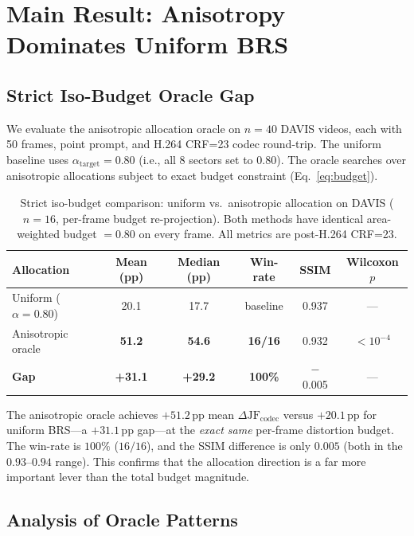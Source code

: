 \section{Main Result: Anisotropy Dominates Uniform BRS}
\label{sec:main_result}

\subsection{Strict Iso-Budget Oracle Gap}

We evaluate the anisotropic allocation oracle on $n{=}40$ DAVIS videos, each with 50 frames, point prompt, and H.264 CRF=23 codec round-trip.
The uniform baseline uses $\alpha_\mathrm{target}{=}0.80$ (i.e., all 8 sectors set to $0.80$).
The oracle searches over anisotropic allocations subject to exact budget constraint (Eq.~\ref{eq:budget}).

\begin{table}[t]
\centering
\small
\caption{Strict iso-budget comparison: uniform vs.\ anisotropic allocation on DAVIS ($n{=}16$, per-frame budget re-projection). Both methods have identical area-weighted budget $=0.80$ on every frame. All metrics are post-H.264 CRF=23.}
\label{tab:oracle_gap}
\begin{tabular}{lccccc}
\toprule
\textbf{Allocation} & \textbf{Mean (pp)} & \textbf{Median (pp)} & \textbf{Win-rate} & \textbf{SSIM} & \textbf{Wilcoxon $p$} \\
\midrule
Uniform ($\alpha{=}0.80$) & 20.1 & 17.7 & baseline & 0.937 & --- \\
Anisotropic oracle & \textbf{51.2} & \textbf{54.6} & \textbf{16/16} & 0.932 & $< 10^{-4}$ \\
\midrule
\textbf{Gap} & \textbf{+31.1} & \textbf{+29.2} & \textbf{100\%} & $-$0.005 & --- \\
\bottomrule
\end{tabular}
\end{table}

The anisotropic oracle achieves $+51.2\,\mathrm{pp}$ mean $\Delta\mathrm{JF}_\mathrm{codec}$ versus $+20.1\,\mathrm{pp}$ for uniform BRS---a $+31.1\,\mathrm{pp}$ gap---at the \emph{exact same} per-frame distortion budget.
The win-rate is $100\%$ ($16/16$), and the SSIM difference is only $0.005$ (both in the $0.93$--$0.94$ range).
This confirms that the allocation direction is a far more important lever than the total budget magnitude.

\subsection{Analysis of Oracle Patterns}

